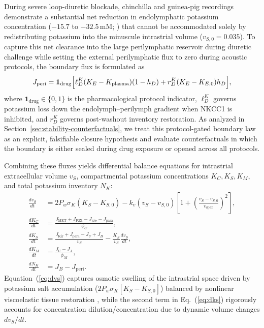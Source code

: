 \documentclass[final,5p,times]{elsarticle}
\begin{document}
During severe loop-diuretic blockade, chinchilla and guinea-pig recordings demonstrate a substantial net reduction in endolymphatic potassium concentration (\(-15.7\) to \(-32.5\,\mathrm{mM}\); \citealt{RybakMorizono1982}) that cannot be accommodated solely by redistributing potassium into the minuscule intrastrial volume (\(v_{S,0} = 0.035\)). To capture this net clearance into the large perilymphatic reservoir during diuretic challenge while setting the external perilymphatic flux to zero during acoustic protocols, the boundary flux is formulated as
\begin{equation}
  J_{\mathrm{peri}} = \mathbf{1}_{\mathrm{drug}}\Bigl[\ell_D^K (K_E - K_{\mathrm{plasma}})(1 - h_D) + r_D^K (K_E - K_{E,0}) h_D\Bigr],
  \label{eq:jperi}
\end{equation}
where \(\mathbf{1}_{\mathrm{drug}} \in \{0,1\}\) is the pharmacological protocol indicator, \(\ell_D^K\) governs potassium loss down the endolymph--perilymph gradient when NKCC1 is inhibited, and \(r_D^K\) governs post-washout inventory restoration. As analyzed in Section~\ref{sec:stability-counterfactuals}, we treat this protocol-gated boundary law as an explicit, falsifiable closure hypothesis and evaluate counterfactuals in which the boundary is either sealed during drug exposure or opened across all protocols.

Combining these fluxes yields differential balance equations for intrastrial extracellular volume \(v_S\), compartmental potassium concentrations \(K_C, K_S, K_M\), and total potassium inventory \(N_K\):
\begin{align}
  \frac{dv_S}{dt} &= 2P_w \sigma_K (K_S - K_{S,0}) - k_v (v_S - v_{S,0})\left[1 + \left(\frac{v_S - v_{S,0}}{v_{\mathrm{span}}}\right)^2\right], \label{eq:dvs}\\
  \frac{dK_C}{dt} &= \frac{J_{\mathrm{MET}} + J_{\mathrm{P2X}} - J_{\mathrm{Kir}} - J_{\mathrm{para}}}{\phi_C}, \label{eq:dkc}\\
  \frac{dK_S}{dt} &= \frac{J_{\mathrm{Kir}} + J_{\mathrm{para}} - J_U + J_B}{v_S} - \frac{K_S}{v_S}\frac{dv_S}{dt}, \label{eq:dks}\\
  \frac{dK_M}{dt} &= \frac{J_U - J_A}{\phi_M}, \label{eq:dkm}\\
  \frac{dN_K}{dt} &= J_B - J_{\mathrm{peri}}. \label{eq:dnk}
\end{align}
Equation~(\ref{eq:dvs}) captures osmotic swelling of the intrastrial space driven by potassium salt accumulation (\(2P_w \sigma_K [K_S - K_{S,0}]\)) balanced by nonlinear viscoelastic tissue restoration \citep{SantiDuvall1979,PikeBosher1980}, while the second term in Eq.~(\ref{eq:dks}) rigorously accounts for concentration dilution/concentration due to dynamic volume changes \(dv_S/dt\).
\end{document}
